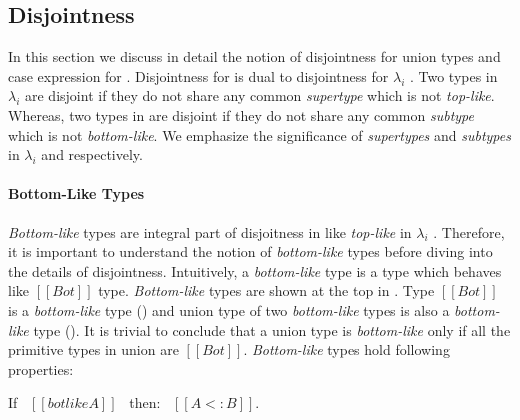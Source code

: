 \subsection{Disjointness}
\label{sec:union:disj}
In this section we discuss in detail the notion of disjointness for union types and case expression
for \cal.
Disjointness for \cal is dual to disjointness for $\lambda_i$ \cite{oliveira2016disjoint}.
Two types in $\lambda_i$ are disjoint if they do not share any common \emph{supertype} 
which is not \emph{top-like}.
Whereas, two types in \cal are disjoint if they do not share any common \emph{subtype} which is not
\emph{bottom-like}. We emphasize the significance of \emph{supertypes} and \emph{subtypes} in
$\lambda_i$ and \cal respectively.

\paragraph{Bottom-Like Types}
\emph{Bottom-like} types are integral part of disjoitness in \cal like \emph{top-like} in 
$\lambda_i$ \cite{oliveira2016disjoint}. Therefore,
it is important to understand the notion of \emph{bottom-like} types before diving into the details 
of disjointness. Intuitively, a \emph{bottom-like} type is a type which behaves like $[[Bot]]$ type. 
\emph{Bottom-like} types are shown at the top in . Type
$[[Bot]]$ is a \emph{bottom-like} type () and union type of two \emph{bottom-like} 
types is also a \emph{bottom-like} type ().
It is trivial to conclude that a union type is \emph{bottom-like} only if all 
the primitive types in union are $[[Bot]]$. \emph{Bottom-like} types hold following properties:

\begin{lemma}
  If \ $[[botlike A]]$ \ then: \ $[[A <: B]]$.
\label{lemma:union:bl-soundness}
\end{lemma}

\begin{comment}
\begin{proof}
  By induction on bottom-like relation.
  \begin{itemize}
    \item All cases are trivial to prove.
  \end{itemize}
\end{proof}
\end{comment}

